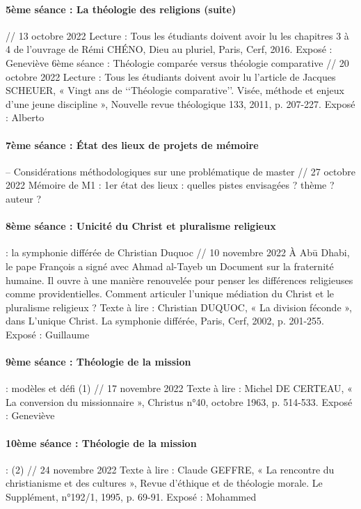 \paragraph{5ème séance : La théologie des religions (suite)} // 13 octobre 2022
Lecture : Tous les étudiants doivent avoir lu les chapitres 3 à 4 de l’ouvrage de Rémi CHÉNO, Dieu au pluriel, Paris, Cerf, 2016. 
 Exposé : Geneviève
6ème séance : Théologie comparée versus théologie comparative // 20 octobre 2022 
Lecture : Tous les étudiants doivent avoir lu l’article de Jacques SCHEUER, « Vingt ans de ‘‘Théologie comparative’’. Visée, méthode et enjeux d’une jeune discipline », Nouvelle revue théologique 133, 2011, p. 207-227.
Exposé : Alberto

\paragraph{7ème séance : État des lieux de projets de mémoire} – Considérations méthodologiques sur une problématique de master // 27 octobre 2022 
Mémoire de M1 : 1er état des lieux : quelles pistes envisagées ? thème ? auteur ?  
 
\paragraph{8ème séance : Unicité du Christ et pluralisme religieux} : la symphonie différée de Christian Duquoc // 10 novembre 2022
 À Abū Dhabi, le pape François a signé avec Ahmad al-Tayeb un Document sur la fraternité humaine. Il ouvre à une manière renouvelée pour penser les différences religieuses comme providentielles. Comment articuler l’unique médiation du Christ et le pluralisme religieux ? 
Texte à lire : Christian DUQUOC, « La division féconde », dans L’unique Christ. La symphonie différée, Paris, Cerf, 2002, p. 201-255. 
Exposé : Guillaume

\paragraph{9ème séance : Théologie de la mission} : modèles et défi (1) // 17 novembre 2022
Texte à lire : Michel DE CERTEAU, « La conversion du missionnaire », Christus n°40, octobre 1963, p. 514-533.
Exposé : Geneviève

\paragraph{10ème séance : Théologie de la mission} :  (2) // 24 novembre 2022
Texte à lire : Claude GEFFRE, « La rencontre du christianisme et des cultures », Revue d’éthique et de théologie morale. Le Supplément, n°192/1, 1995, p. 69-91.
Exposé : Mohammed

